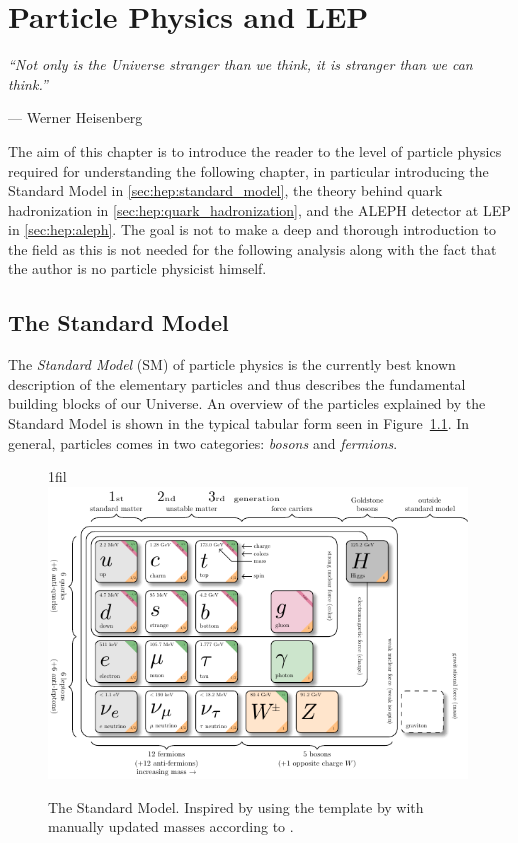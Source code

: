 \documentclass[a4paper, twoside, nobib]{tufte-book}
\makeatletter
\newcommand*{\centerfloat}{%
  \parindent \z@
  \leftskip \z@ \@plus 1fil \@minus \textwidth
  \rightskip\leftskip
  \parfillskip \z@skip}
\newcommand{\autocite}[1]{\citep{#1}}
\makeatother
\begin{document}
\FloatBarrier
\chapter{Particle Physics and LEP}
\label{ch:hep:particle_physcis_LEP}
\epigraph{\textit{``Not only is the Universe stranger than we think, it is stranger than we can think.''}}{--- Werner Heisenberg}

The aim of this chapter is to introduce the reader to the level of particle physics required for understanding the following chapter, in particular introducing the Standard Model in \autoref{sec:hep:standard_model}, the theory behind quark hadronization in \autoref{sec:hep:quark_hadronization}, and the ALEPH detector at LEP in \autoref{sec:hep:aleph}. The goal is not to make a deep and thorough introduction to the field as this is not needed for the following analysis  along with the fact that the author is no particle physicist himself. 


\FloatBarrier
\section{The Standard Model}
\label{sec:hep:standard_model}

The \emph{Standard Model} (SM) \autocite{glashowPartialsymmetriesWeakInteractions1961,salamWeakElectromagneticInteractions1994,weinbergModelLeptons1967} of particle physics is the currently best known description of the elementary particles and thus describes the fundamental building blocks of our Universe. An overview of the particles explained by the Standard Model is shown in the typical tabular form seen in Figure~\ref{fig:hep:standard_model}. In general, particles comes in two categories: \emph{bosons} and \emph{fermions}. 

\begin{figure}
  \centerfloat
  \includegraphics[width=0.99\textwidth]{figures/standard_model/sm.pdf}
  \caption[The Standard Model]{The Standard Model. Inspired by \citet{purcellGoParticleQuest2012} using the template by \citet{burgardStandardModelPhysics} with manually updated masses according to \citet{particledatagroupReviewParticlePhysics2018}.}
  \label{fig:hep:standard_model}
\end{figure}
\end{document}
